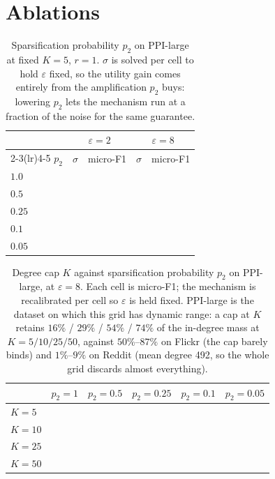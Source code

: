 \documentclass[11pt]{article}
\begin{document}
\section{Ablations}

\begin{table}[H]
\centering\small
\caption{Sparsification probability $p_2$ on PPI-large at fixed
$K{=}5$, $r{=}1$. $\sigma$ is solved per cell to hold $\varepsilon$ fixed, so
the utility gain comes entirely from the amplification $p_2$ buys: lowering
$p_2$ lets the mechanism run at a fraction of the noise for the same
guarantee.}
\label{tab:p2}
\begin{tabular}{lcccc}
\toprule
& \multicolumn{2}{c}{$\varepsilon = 2$} & \multicolumn{2}{c}{$\varepsilon = 8$}\\
\cmidrule(lr){2-3}\cmidrule(lr){4-5}
$p_2$ & $\sigma$ & micro-F1 & $\sigma$ & micro-F1\\
\midrule
$1.0$  & & & & \\
$0.5$  & & & & \\
$0.25$ & & & & \\
$0.1$  & & & & \\
$0.05$ & & & & \\
\bottomrule
\end{tabular}
\end{table}

\begin{table}[H]
\centering\small
\caption{Degree cap $K$ against sparsification probability $p_2$ on PPI-large,
at $\varepsilon{=}8$. Each cell is micro-F1; the mechanism is recalibrated per
cell so $\varepsilon$ is held fixed. PPI-large is the dataset on which this grid
has dynamic range: a cap at $K$ retains $16\%$ / $29\%$ / $54\%$ / $74\%$ of the
in-degree mass at $K = 5/10/25/50$, against $50\%$--$87\%$ on Flickr (the cap
barely binds) and $1\%$--$9\%$ on Reddit (mean degree 492, so the whole grid
discards almost everything).}
\label{tab:k-p2}
\begin{tabular}{lccccc}
\toprule
& $p_2{=}1$ & $p_2{=}0.5$ & $p_2{=}0.25$ & $p_2{=}0.1$ & $p_2{=}0.05$\\
\midrule
$K = 5$  & & & & & \\
$K = 10$ & & & & & \\
$K = 25$ & & & & & \\
$K = 50$ & & & & & \\
\bottomrule
\end{tabular}
\end{table}
\end{document}
